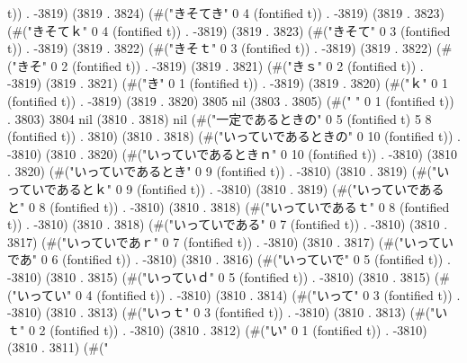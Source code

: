 t)) . -3819) (3819 . 3824) (#("きそてき" 0 4 (fontified t)) . -3819) (3819 . 3823) (#("きそてｋ" 0 4 (fontified t)) . -3819) (3819 . 3823) (#("きそて" 0 3 (fontified t)) . -3819) (3819 . 3822) (#("きそｔ" 0 3 (fontified t)) . -3819) (3819 . 3822) (#("きそ" 0 2 (fontified t)) . -3819) (3819 . 3821) (#("きｓ" 0 2 (fontified t)) . -3819) (3819 . 3821) (#("き" 0 1 (fontified t)) . -3819) (3819 . 3820) (#("ｋ" 0 1 (fontified t)) . -3819) (3819 . 3820) 3805 nil (3803 . 3805) (#(" " 0 1 (fontified t)) . 3803) 3804 nil (3810 . 3818) nil (#("一定であるときの" 0 5 (fontified t) 5 8 (fontified t)) . 3810) (3810 . 3818) (#("いっていであるときの" 0 10 (fontified t)) . -3810) (3810 . 3820) (#("いっていであるときｎ" 0 10 (fontified t)) . -3810) (3810 . 3820) (#("いっていであるとき" 0 9 (fontified t)) . -3810) (3810 . 3819) (#("いっていであるとｋ" 0 9 (fontified t)) . -3810) (3810 . 3819) (#("いっていであると" 0 8 (fontified t)) . -3810) (3810 . 3818) (#("いっていであるｔ" 0 8 (fontified t)) . -3810) (3810 . 3818) (#("いっていである" 0 7 (fontified t)) . -3810) (3810 . 3817) (#("いっていであｒ" 0 7 (fontified t)) . -3810) (3810 . 3817) (#("いっていであ" 0 6 (fontified t)) . -3810) (3810 . 3816) (#("いっていで" 0 5 (fontified t)) . -3810) (3810 . 3815) (#("いっていｄ" 0 5 (fontified t)) . -3810) (3810 . 3815) (#("いってい" 0 4 (fontified t)) . -3810) (3810 . 3814) (#("いって" 0 3 (fontified t)) . -3810) (3810 . 3813) (#("いっｔ" 0 3 (fontified t)) . -3810) (3810 . 3813) (#("いｔ" 0 2 (fontified t)) . -3810) (3810 . 3812) (#("い" 0 1 (fontified t)) . -3810) (3810 . 3811) (#("
